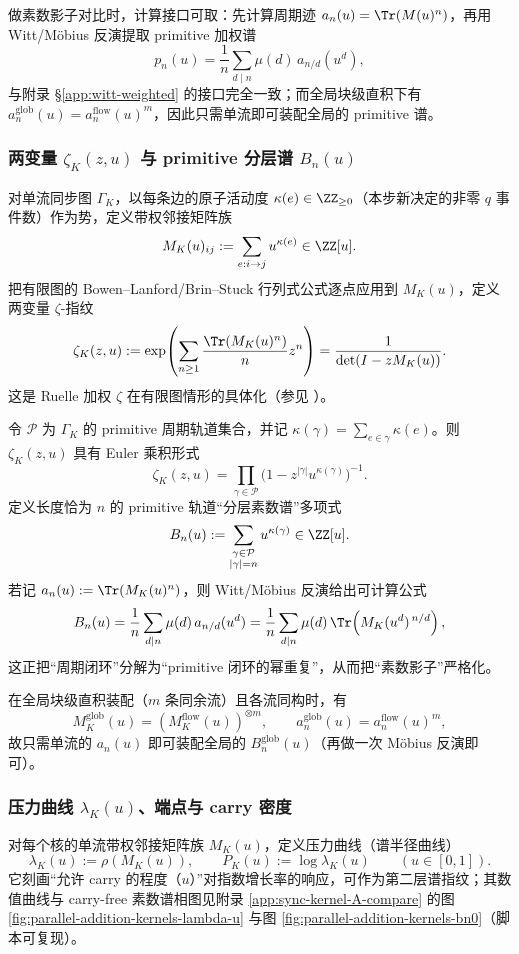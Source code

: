做素数影子对比时，计算接口可取：先计算周期迹 $a_n(u)=\Tr(M(u)^n)$，再用 Witt/Möbius 反演提取 primitive 加权谱
\[
p_n(u)=\frac{1}{n}\sum_{d\mid n}\mu(d)\,a_{n/d}(u^d),
\]
与附录 \S\ref{app:witt-weighted} 的接口完全一致；而全局块级直积下有 $a_n^{\mathrm{glob}}(u)=a_n^{\mathrm{flow}}(u)^m$，因此只需单流即可装配全局的 primitive 谱。

\subsubsection{两变量 \texorpdfstring{$\zeta_K(z,u)$}{zeta(z,u)} 与 primitive 分层谱 \texorpdfstring{$B_n(u)$}{B\_n(u)}}
对单流同步图 $\Gamma_K$，以每条边的原子活动度 $\kappa(e)\in\ZZ_{\ge 0}$（本步新决定的非零 $q$ 事件数）作为势，定义带权邻接矩阵族
\[
M_K(u)_{ij}:=\sum_{e:i\to j}u^{\kappa(e)}\in\ZZ[u].
\]
把有限图的 Bowen--Lanford/Brin--Stuck 行列式公式逐点应用到 $M_K(u)$，定义两变量 $\zeta$-指纹
\[
\zeta_K(z,u)
:=\exp\!\left(\sum_{n\ge 1}\frac{\Tr(M_K(u)^n)}{n}z^n\right)
=\frac{1}{\det(I-zM_K(u))}.
\]
这是 Ruelle 加权 $\zeta$ 在有限图情形的具体化（参见 \cite{Ruelle1976ZetaExpanding,ParryPollicott1990Zeta,BrinStuck2002}）。

令 $\mathcal{P}$ 为 $\Gamma_K$ 的 primitive 周期轨道集合，并记 $\kappa(\gamma)=\sum_{e\in\gamma}\kappa(e)$。则 $\zeta_K(z,u)$ 具有 Euler 乘积形式
\[
\zeta_K(z,u)=\prod_{\gamma\in\mathcal{P}}\bigl(1-z^{|\gamma|}u^{\kappa(\gamma)}\bigr)^{-1}.
\]
定义长度恰为 $n$ 的 primitive 轨道“分层素数谱”多项式
\[
B_n(u):=\sum_{\substack{\gamma\in\mathcal{P}\\|\gamma|=n}}u^{\kappa(\gamma)}\in\ZZ[u].
\]
若记 $a_n(u):=\Tr(M_K(u)^n)$，则 Witt/Möbius 反演给出可计算公式
\[
B_n(u)=\frac{1}{n}\sum_{d\mid n}\mu(d)\,a_{n/d}(u^d)
=\frac{1}{n}\sum_{d\mid n}\mu(d)\,\Tr\!\left(M_K(u^d)^{\,n/d}\right),
\]
这正把“周期闭环”分解为“primitive 闭环的幂重复”，从而把“素数影子”严格化。

在全局块级直积装配（$m$ 条同余流）且各流同构时，有
\[
M_K^{\mathrm{glob}}(u)=(M_K^{\mathrm{flow}}(u))^{\otimes m},\qquad
a_n^{\mathrm{glob}}(u)=a_n^{\mathrm{flow}}(u)^m,
\]
故只需单流的 $a_n(u)$ 即可装配全局的 $B_n^{\mathrm{glob}}(u)$（再做一次 Möbius 反演即可）。

\subsubsection{压力曲线 \texorpdfstring{$\lambda_K(u)$}{lambda(u)}、端点与 carry 密度}\label{subsec:kernel-pressure-curve}
对每个核的单流带权邻接矩阵族 $M_K(u)$，定义压力曲线（谱半径曲线）
\[
\lambda_K(u):=\rho(M_K(u)),\qquad P_K(u):=\log\lambda_K(u)\qquad(u\in[0,1]).
\]
它刻画“允许 carry 的程度（$u$）”对指数增长率的响应，可作为第二层谱指纹；其数值曲线与 carry-free 素数谱相图见附录 \ref{app:sync-kernel-A-compare} 的图 \ref{fig:parallel-addition-kernels-lambda-u} 与图 \ref{fig:parallel-addition-kernels-bn0}（脚本可复现）。

